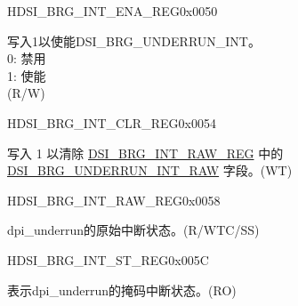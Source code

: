\begin{register}{H}{DSI\_BRG\_INT\_ENA\_REG}{0x0050}\label{regdesc:DSIBRGINTENAREG}
%
%
\regnewline%
\begin{regdesc}\begin{reglist}
\label{fielddesc:DSIBRGUNDERRUNINTENA}\item [DSI\_BRG\_UNDERRUN\_INT\_ENA] 写入1以使能DSI\_BRG\_UNDERRUN\_INT。\\0: 禁用\\1: 使能 \\(R/W)
\end{reglist}\end{regdesc}
\end{register}


\begin{register}{H}{DSI\_BRG\_INT\_CLR\_REG}{0x0054}\label{regdesc:DSIBRGINTCLRREG}
%
%
\regnewline%
\begin{regdesc}\begin{reglist}
\label{fielddesc:DSIBRGUNDERRUNINTCLR}\item [DSI\_BRG\_UNDERRUN\_INT\_CLR] 写入 1 以清除 \hyperref[regdesc:DSIBRGINTRAWREG]{DSI\_BRG\_INT\_RAW\_REG} 中的 \hyperref[fielddesc:DSIBRGUNDERRUNINTRAW]{DSI\_\-BRG\_\-UNDERRUN\_\-INT\_\-RAW} 字段。(WT)
\end{reglist}\end{regdesc}
\end{register}


\begin{register}{H}{DSI\_BRG\_INT\_RAW\_REG}{0x0058}\label{regdesc:DSIBRGINTRAWREG}
%
%
\regnewline%
\begin{regdesc}\begin{reglist}
\label{fielddesc:DSIBRGUNDERRUNINTRAW}\item [DSI\_BRG\_UNDERRUN\_INT\_RAW] dpi\_underrun的原始中断状态。(R/WTC/SS)
\end{reglist}\end{regdesc}
\end{register}


\begin{register}{H}{DSI\_BRG\_INT\_ST\_REG}{0x005C}\label{regdesc:DSIBRGINTSTREG}
%
%
\regnewline%
\begin{regdesc}\begin{reglist}
\label{fielddesc:DSIBRGUNDERRUNINTST}\item [DSI\_BRG\_UNDERRUN\_INT\_ST] 表示dpi\_underrun的掩码中断状态。(RO)
\end{reglist}\end{regdesc}
\end{register}

